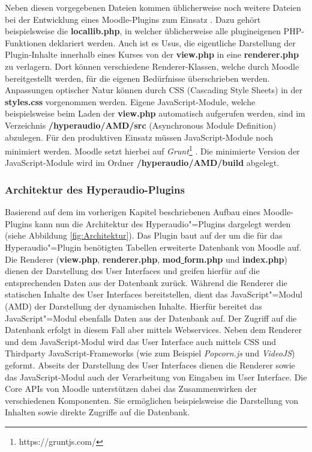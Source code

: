 Neben diesen vorgegebenen Dateien kommen üblicherweise noch weitere Dateien bei der Entwicklung eines Moodle-Plugins zum Einsatz \citep{wild2017moodle}. Dazu gehört beispielsweise die \textbf{locallib.php}, in welcher üblicherweise alle plugineigenen PHP-Funktionen deklariert werden. Auch ist es Usus, die eigentliche Darstellung der Plugin-Inhalte innerhalb eines Kurses von der \textbf{view.php} in eine \textbf{renderer.php} zu verlagern. Dort können verschiedene Renderer-Klassen, welche durch Moodle bereitgestellt werden, für die eigenen Bedürfnisse überschrieben werden. Anpassungen optischer Natur können durch CSS (Cascading Style Sheets) in der \textbf{styles.css} vorgenommen werden. Eigene JavaScript-Module, welche beispielsweise beim Laden der \textbf{view.php} automatisch aufgerufen werden, sind im Verzeichnis \textbf{/hyperaudio/AMD/src} (Asynchronous Module Definition) abzulegen. Für den produktiven Einsatz müssen JavaScript-Module noch minimiert werden. Moodle setzt hierbei auf \textit{Grunt}\footnote{https://gruntjs.com/} \citep{moodle2018grunt}. Die minimierte Version der JavaScript-Module wird im Ordner \textbf{/hyperaudio/AMD/build} abgelegt.

\subsubsection{Architektur des Hyperaudio-Plugins}
Basierend auf dem im vorherigen Kapitel beschriebenen Aufbau eines Moodle-Plugins kann nun die Architektur des Hyperaudio"=Plugins dargelegt werden (siehe Abbildung \ref{fig:Architektur}). Das Plugin baut auf der um die für das Hyperaudio"=Plugin benötigten Tabellen erweiterte Datenbank von Moodle auf. Die Renderer (\textbf{view.php}, \textbf{renderer.php}, \textbf{mod\underline{{ }}form.php} und \textbf{index.php}) dienen der Darstellung des User Interfaces und greifen hierfür auf die entsprechenden Daten aus der Datenbank zurück. Während die Renderer die statischen Inhalte des User Interfaces bereitstellen, dient das JavaScript"=Modul (AMD) der Darstellung der dynamischen Inhalte. Hierfür bereitet das JavaScript"=Modul ebenfalls Daten aus der Datenbank auf. Der Zugriff auf die Datenbank erfolgt in diesem Fall aber mittels Webservices. Neben dem Renderer und dem JavaScript-Modul wird das User Interface auch mittels CSS und Thirdparty JavaScript-Frameworks (wie zum Beispiel \textit{Popcorn.js} und \textit{VideoJS}) geformt. Abseits der Darstellung des User Interfaces dienen die Renderer sowie das JavaScript-Modul auch der Verarbeitung von Eingaben im User Interface. Die Core APIs von Moodle unterstützen dabei das Zusammenwirken der verschiedenen Komponenten. Sie ermöglichen beispielsweise die Darstellung von Inhalten sowie direkte Zugriffe auf die Datenbank.

